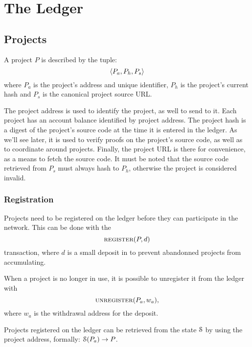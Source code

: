 \section{The \oscoin{} Ledger}

\subsection{Projects}
\label{s:projects}

A project $P$ is described by the tuple:
\[
    \langle P_{a}, P_h, P_s\rangle
\]
where $P_{a}$ is the project's address and unique identifier, $P_h$ is
the project's current hash and $P_s$ is the canonical project source URL.

The project address is used to identify the project, as well to send
\oscoin{} to it. Each project has an account balance identified by project
address. The project hash is a digest of the project's source code at the time
it is entered in the ledger. As we'll see later, it is used to verify proofs
on the project's source code, as well as to coordinate around projects. Finally,
the project URL is there for convenience, as a means to fetch the source code.
It must be noted that the source code retrieved from $P_s$ must always hash to
$P_h$, otherwise the project is considered invalid.

\subsubsection{Registration} Projects need to be registered on the ledger
before they can participate in the network. This can be done with the
\[
    \text{\normalfont\scshape register}\small{\lparen P, d\rparen}
\]
transaction, where $d$ is a small deposit in \oscoin{} to prevent abandonned
projects from accumulating.

When a project is no longer in use, it is possible to unregister it from the
ledger with
\[
    \text{\normalfont\scshape unregister}\small{\lparen P_a, w_a\rparen},
\]
where $w_a$ is the withdrawal address for the deposit.

Projects registered on the ledger can be retrieved from the state $\mathcal{S}$ by
using the project address, formally: $\mathcal{S}(P_a) \to P$.

